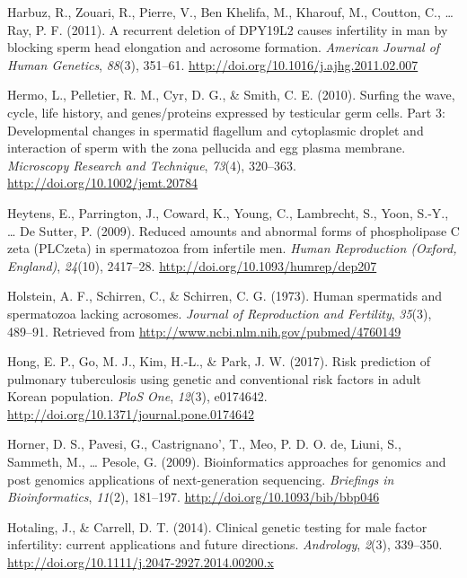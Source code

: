 \documentclass[12pt,twoside]{reedthesis}
\theoremstyle{definition}
\theoremstyle{definition}
\theoremstyle{remark}
\begin{document}
  \hypertarget{ref-Harbuz2011}{}
  Harbuz, R., Zouari, R., Pierre, V., Ben Khelifa, M., Kharouf, M.,
  Coutton, C., \ldots{} Ray, P. F. (2011). A recurrent deletion of DPY19L2
  causes infertility in man by blocking sperm head elongation and acrosome
  formation. \emph{American Journal of Human Genetics}, \emph{88}(3),
  351--61. \url{http://doi.org/10.1016/j.ajhg.2011.02.007}
  
  \hypertarget{ref-Hermo2010}{}
  Hermo, L., Pelletier, R. M., Cyr, D. G., \& Smith, C. E. (2010). Surfing
  the wave, cycle, life history, and genes/proteins expressed by
  testicular germ cells. Part 3: Developmental changes in spermatid
  flagellum and cytoplasmic droplet and interaction of sperm with the zona
  pellucida and egg plasma membrane. \emph{Microscopy Research and
  Technique}, \emph{73}(4), 320--363.
  \url{http://doi.org/10.1002/jemt.20784}
  
  \hypertarget{ref-Heytens2009}{}
  Heytens, E., Parrington, J., Coward, K., Young, C., Lambrecht, S., Yoon,
  S.-Y., \ldots{} De Sutter, P. (2009). Reduced amounts and abnormal forms
  of phospholipase C zeta (PLCzeta) in spermatozoa from infertile men.
  \emph{Human Reproduction (Oxford, England)}, \emph{24}(10), 2417--28.
  \url{http://doi.org/10.1093/humrep/dep207}
  
  \hypertarget{ref-Holstein1973}{}
  Holstein, A. F., Schirren, C., \& Schirren, C. G. (1973). Human
  spermatids and spermatozoa lacking acrosomes. \emph{Journal of
  Reproduction and Fertility}, \emph{35}(3), 489--91. Retrieved from
  \url{http://www.ncbi.nlm.nih.gov/pubmed/4760149}
  
  \hypertarget{ref-Hong2017}{}
  Hong, E. P., Go, M. J., Kim, H.-L., \& Park, J. W. (2017). Risk
  prediction of pulmonary tuberculosis using genetic and conventional risk
  factors in adult Korean population. \emph{PloS One}, \emph{12}(3),
  e0174642. \url{http://doi.org/10.1371/journal.pone.0174642}
  
  \hypertarget{ref-Horner2009}{}
  Horner, D. S., Pavesi, G., Castrignano', T., Meo, P. D. O. de, Liuni,
  S., Sammeth, M., \ldots{} Pesole, G. (2009). Bioinformatics approaches
  for genomics and post genomics applications of next-generation
  sequencing. \emph{Briefings in Bioinformatics}, \emph{11}(2), 181--197.
  \url{http://doi.org/10.1093/bib/bbp046}
  
  \hypertarget{ref-Hotaling2014}{}
  Hotaling, J., \& Carrell, D. T. (2014). Clinical genetic testing for
  male factor infertility: current applications and future directions.
  \emph{Andrology}, \emph{2}(3), 339--350.
  \url{http://doi.org/10.1111/j.2047-2927.2014.00200.x}
  
\end{document}

